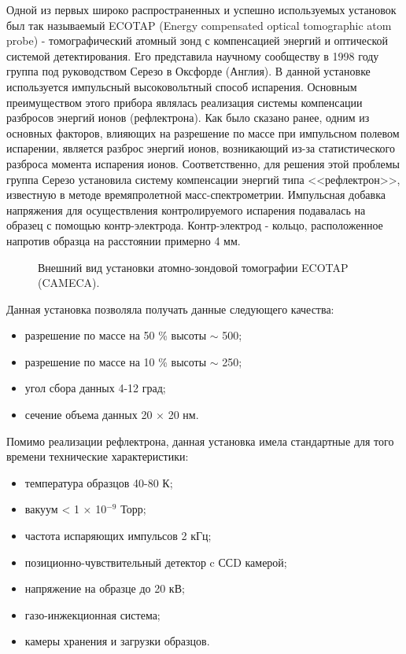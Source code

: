 Одной из первых широко распространенных и успешно используемых установок был так называемый ECOTAP (Energy compensated optical tomographic atom probe) - томографический атомный зонд с компенсацией энергий и оптической системой детектирования. Его представила научному сообществу в 1998 году группа под руководством Серезо в Оксфорде \cite{Cerezo98} (Англия). В данной установке используется импульсный высоковольтный способ испарения. Основным преимуществом этого прибора являлась реализация системы компенсации разбросов энергий ионов (рефлектрона). Как было сказано ранее, одним из основных факторов, влияющих на разрешение по массе при импульсном полевом испарении, является разброс энергий ионов, возникающий из-за статистического разброса момента испарения ионов. Соответственно, для решения этой проблемы группа Серезо установила систему компенсации энергий типа <<рефлектрон>>, известную в методе времяпролетной масс-спектрометрии. Импульсная добавка напряжения для осуществления контролируемого испарения подавалась на образец с помощью контр-электрода. Контр-электрод - кольцо, расположенное напротив образца на расстоянии примерно 4 мм.

\begin{figure}[htb]
	\caption{Внешний вид установки атомно-зондовой томографии ECOTAP (CAMECA).}
	\label{fig:ECOTAP}
\end{figure}
Данная установка позволяла получать данные следующего качества:
\begin{itemize}[beginpenalty=10000] %
	\item разрешение по массе на 50 \% высоты  $\sim$ 500;
	\item разрешение по массе на 10 \% высоты $\sim$ 250;
	\item угол сбора данных 4-12 град;
	\item сечение объема данных 20 × 20 нм.  
\end{itemize}

	
Помимо реализации рефлектрона, данная установка имела стандартные для того времени технические характеристики:
\begin{itemize}[beginpenalty=10000] %
	\item температура образцов 40-80 К;
	\item вакуум < 1 × 10$^{-9}$ Торр; 
	\item частота испаряющих импульсов 2 кГц;
	\item позиционно-чувствительный детектор c ССD камерой;
	\item напряжение на образце до 20 кВ; 
	\item газо-инжекционная система;
	\item камеры хранения и загрузки образцов.
\end{itemize}



